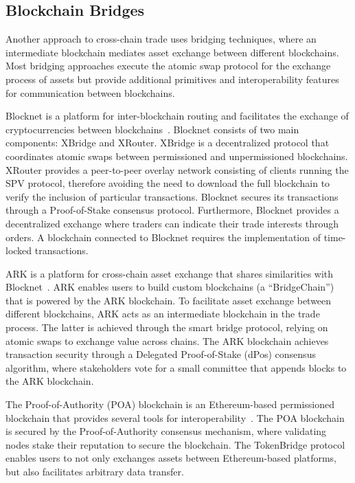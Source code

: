 
\subsection{Blockchain Bridges}
Another approach to cross-chain trade uses bridging techniques, where an intermediate blockchain mediates asset exchange between different blockchains.
Most bridging approaches execute the atomic swap protocol for the exchange process of assets but provide additional primitives and interoperability features for communication between blockchains.

Blocknet is a platform for inter-blockchain routing and facilitates the exchange of cryptocurrencies between blockchains~\cite{culwick2019blocknet}.
Blocknet consists of two main components: XBridge and XRouter.
XBridge is a decentralized protocol that coordinates atomic swaps between permissioned and unpermissioned blockchains.
XRouter provides a peer-to-peer overlay network consisting of clients running the SPV protocol, therefore avoiding the need to download the full blockchain to verify the inclusion of particular transactions.
Blocknet secures its transactions through a Proof-of-Stake consensus protocol.
Furthermore, Blocknet provides a decentralized exchange where traders can indicate their trade interests through orders.
A blockchain connected to Blocknet requires the implementation of time-locked transactions.

ARK is a platform for cross-chain asset exchange that shares similarities with Blocknet~\cite{ark2019whitepaper}.
ARK enables users to build custom blockchains (a \enquote{BridgeChain}) that is powered by the ARK blockchain.
To facilitate asset exchange between different blockchains, ARK acts as an intermediate blockchain in the trade process.
The latter is achieved through the smart bridge protocol, relying on atomic swaps to exchange value across chains.
The ARK blockchain achieves transaction security through a Delegated Proof-of-Stake (dPos) consensus algorithm, where stakeholders vote for a small committee that appends blocks to the ARK blockchain.

The Proof-of-Authority (POA) blockchain is an Ethereum-based permissioned blockchain that provides several tools for interoperability~\cite{poa2018whitepaper}.
The POA blockchain is secured by the Proof-of-Authority consensus mechanism, where validating nodes stake their reputation to secure the blockchain.
The TokenBridge protocol enables users to not only exchanges assets between Ethereum-based platforms, but also facilitates arbitrary data transfer.

